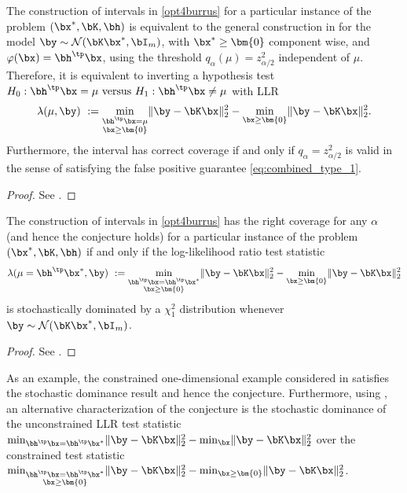\documentclass[11pt]{article}
\numberwithin{equation}{section}
\numberwithin{figure}{section}
\begin{document}
\begin{lemma}
\label{lemma:burruschi2}
The construction of intervals in \eqref{opt4burrus} for a particular instance of the problem $(\bx^*, \bK, \bh)$ is equivalent to the general construction in  for the model $\by \sim \mathcal{N}(\bK \bx^*, \bI_m)$, with $\bx^* \geq \bm{0}$ component wise, and $\varphi(\bx) = \bh^\tp \bx$, using the threshold $q_\alpha(\mu) = z_{\alpha/2}^2$ independent of $\mu$. 
Therefore, it is equivalent to inverting a hypothesis test $H_0: \bh^\tp \bx = \mu \text{ versus } H_1: \bh^\tp \bx \neq \mu$ with LLR
\begin{equation}\label{eq:llrburrus}
\lambda(\mu, \by) ~:= \min_{\substack{\bh^\tp \bx = \mu  \\ \bx \geq \bm{0}}} \lVert \by - \bK \bx \rVert_2^2 - \min_{\bx \geq \bm{0}} \lVert \by - \bK \bx \rVert_2^2.
\end{equation}
Furthermore, the interval has correct coverage if and only if $q_\alpha=z^2_{\alpha/2}$ is valid in the sense of satisfying the false positive guarantee \eqref{eq:combined_type_1}.
\end{lemma}
\begin{proof}
    See .
\end{proof}

\begin{lemma}
\label{lemma:burruschi2B}
The construction of intervals in \eqref{opt4burrus} has the right coverage for any $\alpha$ (and hence the conjecture holds) for a particular instance of the problem $(\bx^*, \bK, \bh)$ if and only if the log-likelihood ratio test statistic
    \begin{equation*}
    \lambda(\mu = \bh^\tp\bx^*, \by) ~:= \min_{\substack{\bh^\tp \bx = \bh^\tp\bx^*  \\ \bx \geq \bm{0}}} \lVert \by - \bK \bx \rVert_2^2 - \min_{\bx \geq \bm{0}} \lVert \by - \bK \bx \rVert_2^2
    \end{equation*}
    is stochastically dominated by a $\chi^2_1$ distribution whenever $\by \sim \mathcal N(\bK \bx^*, \bI_m)$.
\end{lemma}
\begin{proof}
    See .
\end{proof}

As an example, the constrained one-dimensional example considered in  satisfies the stochastic dominance result and hence the conjecture. 
Furthermore, using , an alternative characterization of the conjecture is the stochastic dominance of the unconstrained LLR test statistic
$\min_{\bh^\tp \bx = \bh^\tp \bx^*} \lVert \by - \bK \bx \rVert_2^2 - \min_{\bx} \lVert \by - \bK \bx \rVert_2^2$ over the constrained test statistic $\min_{\substack{\bh^\tp \bx = \bh^\tp\bx^*  \\ \bx \geq \bm{0}}} \lVert \by - \bK \bx \rVert_2^2 - \min_{\bx \geq \bm{0}} \lVert \by - \bK \bx \rVert_2^2$.
\end{document}
